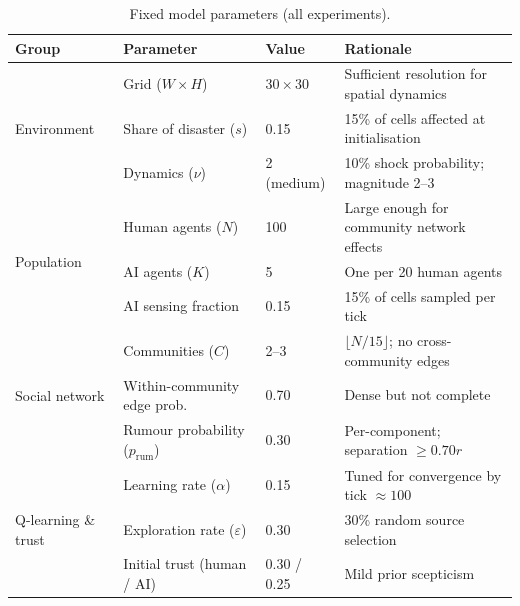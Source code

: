 \documentclass[pdflatex,sn-apa]{sn-jnl}%
\begin{document}
\begin{table}[h]
\centering
\caption{Fixed model parameters (all experiments).}
\label{tab:fixed_params}
\renewcommand{\arraystretch}{1.25}
\begin{tabular}{llll}
\hline
\textbf{Group} & \textbf{Parameter} & \textbf{Value} & \textbf{Rationale} \\
\hline
\multirow{3}{*}{Environment}
  & Grid ($W\times H$)                    & $30\times30$ & Sufficient resolution for spatial dynamics \\
  & Share of disaster ($s$)               & 0.15         & 15\% of cells affected at initialisation \\
  & Dynamics ($\nu$)                      & 2 (medium)   & 10\% shock probability; magnitude 2--3 \\
\hline
\multirow{3}{*}{Population}
  & Human agents ($N$)                    & 100  & Large enough for community network effects \\
  & AI agents ($K$)                       & 5    & One per 20 human agents \\
  & AI sensing fraction                   & 0.15 & 15\% of cells sampled per tick \\
\hline
\multirow{3}{*}{Social network}
  & Communities ($C$)                     & 2--3  & $\lfloor N/15\rfloor$; no cross-community edges \\
  & Within-community edge prob.\          & 0.70  & Dense but not complete \\
  & Rumour probability ($p_\mathrm{rum}$) & 0.30  & Per-component; separation $\ge0.70r$ \\
\hline
\multirow{3}{*}{Q-learning \& trust}
  & Learning rate ($\alpha$)              & 0.15        & Tuned for convergence by tick $\approx100$ \\
  & Exploration rate ($\varepsilon$)      & 0.30        & 30\% random source selection \\
  & Initial trust (human / AI)           & 0.30 / 0.25 & Mild prior scepticism \\
\hline
\end{tabular}
\end{table}
\end{document}
